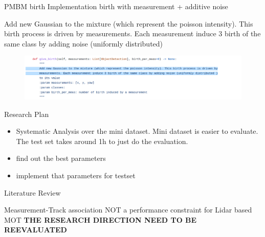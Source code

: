 \documentclass[aspectratio=169,xcolor=dvipsnames]{beamer}
\begin{document}
\begin{frame}{PMBM birth Implementation}
    birth with measurement + additive noise
    \begin{block}{}
    Add new Gaussian to the mixture (which represent the poisson intensity). This birth process is driven by
    measurements. Each measurement induce 3 birth of the same class by adding noise (uniformly distributed)
    \href{https://github.com/quan-dao/pmbm-filter/blob/5cdf8b31665f1a7008afa963c1ab7c3b048b5856/poisson.py}{}
    \end{block}
    \begin{figure}
        \includegraphics[width=0.9\linewidth]{pmbm/1.png}
    \end{figure}
\end{frame}

\begin{frame}{Research Plan}
    \begin{itemize}
        \item{Systematic Analysis over the mini dataset. Mini dataset is easier to evaluate. The test set takes around 1h to just do the evaluation.}
        \item{find out the best parameters}
        \item{implement that parameters for testset}
    \end{itemize}
\end{frame}

\begin{frame}{Literature Review}
\begin{block}{Measurement-Track association NOT a performance constraint for Lidar based MOT}
    \textbf{THE RESEARCH DIRECTION NEED TO BE REEVALUATED}
\end{block}
\end{frame}
\end{document}
